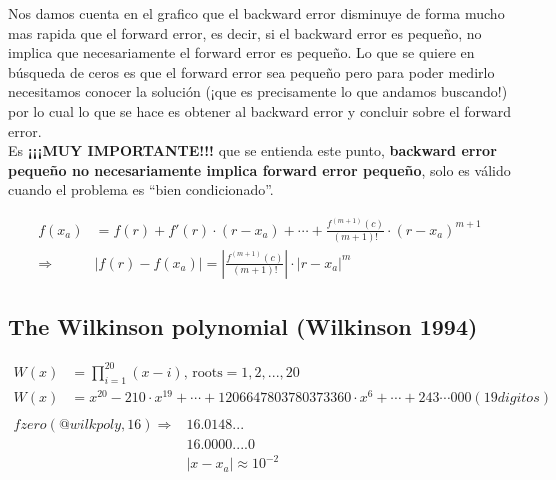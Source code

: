 Nos damos cuenta en el grafico que el backward error disminuye de forma mucho mas rapida que el forward error, es decir, si el backward error es pequeño, no implica que necesariamente el forward error es pequeño.
Lo que se quiere en búsqueda de ceros es que el forward error sea pequeño pero para poder medirlo necesitamos conocer la solución (¡que es precisamente lo que andamos buscando!) por lo cual lo que se hace es obtener al backward
error y concluir sobre el forward error. \\
\vspace{0.2cm}
Es \textbf{\color{red}¡¡¡MUY IMPORTANTE!!!} que se entienda este punto, \textbf{backward error pequeño no necesariamente implica forward error pequeño}, solo es válido cuando el problema es “bien condicionado”.

\vspace{0.2cm}
\begin{equation*}
\begin{aligned}
f(x_a) &= f(r) + f'(r) \cdot (r-x_a) + \cdots + \frac{f^{(m+1)}(c)}{(m+1)!} \cdot (r-x_a)^{m+1}\\
\Rightarrow & |f(r) - f(x_a)| = \left|\frac{f^{(m+1)}(c)}{(m+1)!}\right| \cdot |r-x_a|^m
\end{aligned}
\end{equation*}
\subsection{The Wilkinson polynomial (Wilkinson 1994)}
\begin{center}
\begin{equation*}
\begin{aligned}
W(x) &= \prod_{i = 1}^{20} (x-i) \text{, roots} = 1, 2, ..., 20\\
W(x) &= x^{20} - 210 \cdot x^{19} + \cdots + 1206647803780373360 \cdot x^6 + \cdots + 243 \cdots 000 (19 digitos) \\
\end{aligned}
\end{equation*}
\vspace{1cm}
$
\begin{aligned}
fzero(@wilkpoly, 16) \Rightarrow & 16.0148... \\ 
& 16.0000....0\\
&|x-x_a| \approx 10^{-2} 
\end{aligned}
$
\end{center}
